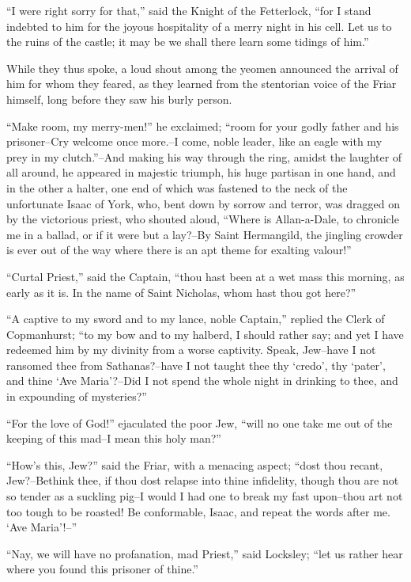 ``I were right sorry for that,'' said the Knight of the Fetterlock,
``for I stand indebted to him for the joyous hospitality of a merry
night in his cell. Let us to the ruins of the castle; it may be we shall
there learn some tidings of him.''

While they thus spoke, a loud shout among the yeomen announced the
arrival of him for whom they feared, as they learned from the stentorian
voice of the Friar himself, long before they saw his burly person.

``Make room, my merry-men!'' he exclaimed; ``room for your godly father
and his prisoner--Cry welcome once more.--I come, noble leader, like an
eagle with my prey in my clutch.''--And making his way through the ring,
amidst the laughter of all around, he appeared in majestic triumph, his
huge partisan in one hand, and in the other a halter, one end of which
was fastened to the neck of the unfortunate Isaac of York, who, bent
down by sorrow and terror, was dragged on by the victorious priest, who
shouted aloud, ``Where is Allan-a-Dale, to chronicle me in a ballad, or
if it were but a lay?--By Saint Hermangild, the jingling crowder is ever
out of the way where there is an apt theme for exalting valour!''

``Curtal Priest,'' said the Captain, ``thou hast been at a wet mass this
morning, as early as it is. In the name of Saint Nicholas, whom hast
thou got here?''

``A captive to my sword and to my lance, noble Captain,'' replied the
Clerk of Copmanhurst; ``to my bow and to my halberd, I should rather
say; and yet I have redeemed him by my divinity from a worse captivity.
Speak, Jew--have I not ransomed thee from Sathanas?--have I not taught
thee thy `credo', thy `pater', and thine `Ave Maria'?--Did I not spend
the whole night in drinking to thee, and in expounding of mysteries?''

``For the love of God!'' ejaculated the poor Jew, ``will no one take me
out of the keeping of this mad--I mean this holy man?''

``How's this, Jew?'' said the Friar, with a menacing aspect; ``dost thou
recant, Jew?--Bethink thee, if thou dost relapse into thine infidelity,
though thou are not so tender as a suckling pig--I would I had one to
break my fast upon--thou art not too tough to be roasted! Be
conformable, Isaac, and repeat the words after me. `Ave Maria'!--''

``Nay, we will have no profanation, mad Priest,'' said Locksley; ``let
us rather hear where you found this prisoner of thine.''

